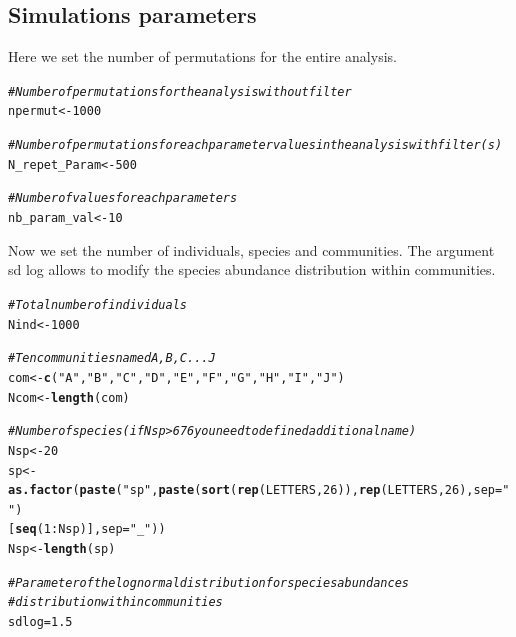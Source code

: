 \documentclass[12pt]{article}\usepackage[]{graphicx}\usepackage[]{color}
\makeatletter
\newcommand{\hlnum}[1]{\textcolor[rgb]{0.686,0.059,0.569}{#1}}%
\newcommand{\hlstr}[1]{\textcolor[rgb]{0.192,0.494,0.8}{#1}}%
\newcommand{\hlcom}[1]{\textcolor[rgb]{0.678,0.584,0.686}{\textit{#1}}}%
\newcommand{\hlopt}[1]{\textcolor[rgb]{0,0,0}{#1}}%
\newcommand{\hlstd}[1]{\textcolor[rgb]{0.345,0.345,0.345}{#1}}%
\newcommand{\hlkwb}[1]{\textcolor[rgb]{0.69,0.353,0.396}{#1}}%
\newcommand{\hlkwc}[1]{\textcolor[rgb]{0.333,0.667,0.333}{#1}}%
\newcommand{\hlkwd}[1]{\textcolor[rgb]{0.737,0.353,0.396}{\textbf{#1}}}%
\newenvironment{kframe}{%
 \def\at@end@of@kframe{}%
 \ifinner\ifhmode%
  \def\at@end@of@kframe{\end{minipage}}%
  \begin{minipage}{\columnwidth}%
 \fi\fi%
 \def\FrameCommand##1{\hskip\@totalleftmargin \hskip-\fboxsep
 \colorbox{shadecolor}{##1}\hskip-\fboxsep
     \hskip-\linewidth \hskip-\@totalleftmargin \hskip\columnwidth}%
 \MakeFramed {\advance\hsize-\width
   \@totalleftmargin\z@ \linewidth\hsize
   \@setminipage}}%
 {\par\unskip\endMakeFramed%
 \at@end@of@kframe}
\newenvironment{knitrout}{}{} %
\makeatother
\begin{document}
  
  
  
  
  
  
  \subsection{Simulations parameters}

Here we set the number of permutations for the entire analysis. 

\begin{knitrout}\small
{}\color{fgcolor}\begin{kframe}
\begin{alltt}
\hlcom{#Number of permutations for the analysis without filter}
\hlstd{npermut} \hlkwb{<-} \hlnum{1000}

\hlcom{#Number of permutations for each parameter values in the analysis with filter(s)}
\hlstd{N_repet_Param} \hlkwb{<-} \hlnum{500}

\hlcom{#Number of values for each parameters}
\hlstd{nb_param_val} \hlkwb{<-} \hlnum{10}
\end{alltt}
\end{kframe}
\end{knitrout}

Now we set the number of individuals, species and communities. 
The argument sd log allows to modify the species abundance distribution within communities.

\begin{knitrout}\small
{}\color{fgcolor}\begin{kframe}
\begin{alltt}
\hlcom{#Total number of individuals}
\hlstd{Nind} \hlkwb{<-} \hlnum{1000}

\hlcom{#Ten communities named A, B, C ... J}
\hlstd{com} \hlkwb{<-} \hlkwd{c}\hlstd{(}\hlstr{"A"}\hlstd{,} \hlstr{"B"}\hlstd{,} \hlstr{"C"}\hlstd{,} \hlstr{"D"}\hlstd{,} \hlstr{"E"}\hlstd{,} \hlstr{"F"}\hlstd{,} \hlstr{"G"}\hlstd{,} \hlstr{"H"}\hlstd{,} \hlstr{"I"}\hlstd{,} \hlstr{"J"}\hlstd{)}
\hlstd{Ncom} \hlkwb{<-} \hlkwd{length}\hlstd{(com)}

\hlcom{#Number of species (if Nsp > 676 you need to defined additional name)}
\hlstd{Nsp} \hlkwb{<-} \hlnum{20}
\hlstd{sp} \hlkwb{<-} \hlkwd{as.factor}\hlstd{(}\hlkwd{paste}\hlstd{(}\hlstr{"sp"}\hlstd{,} \hlkwd{paste}\hlstd{(}\hlkwd{sort}\hlstd{(}\hlkwd{rep}\hlstd{(LETTERS,} \hlnum{26}\hlstd{)),} \hlkwd{rep}\hlstd{(LETTERS,} \hlnum{26}\hlstd{),}  \hlkwc{sep}\hlstd{=}\hlstr{""}\hlstd{)}
                     \hlstd{[}\hlkwd{seq}\hlstd{(}\hlnum{1}\hlopt{:}\hlstd{Nsp)],} \hlkwc{sep} \hlstd{=}\hlstr{"_"}\hlstd{))}
\hlstd{Nsp} \hlkwb{<-} \hlkwd{length}\hlstd{(sp)}

\hlcom{#Parameter of the log normal distribution for species abundances }
\hlcom{#distribution within communities}
\hlstd{sdlog} \hlkwb{=} \hlnum{1.5}
\end{alltt}
\end{kframe}
\end{knitrout}
\end{document}
